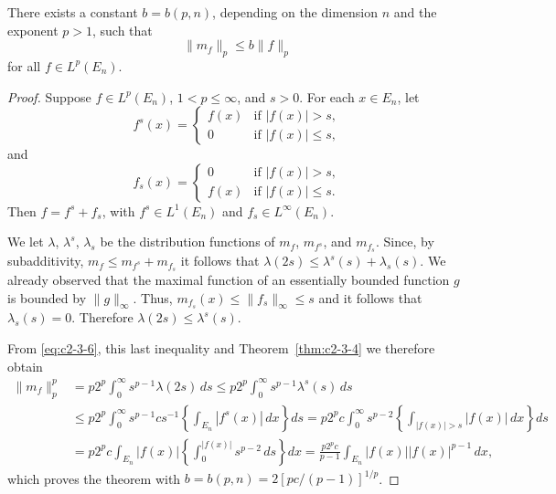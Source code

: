 \begin{theorem}\label{thm:c2-3-7}
There exists a constant $b = b(p, n)$, depending on the dimension $n$ and the exponent $p > 1$, such that
\[
\|m_f\|_p \leq b\|f\|_p
\]
for all $f \in L^p(E_n)$.
\end{theorem}

\begin{proof}
Suppose $f \in L^p(E_n)$, $1 < p \leq \infty$, and $s > 0$. For each $x \in E_n$, let
\[
f^s(x) = \begin{cases} f(x) & \text{if } |f(x)| > s, \\ 0 & \text{if } |f(x)| \leq s, \end{cases}
\]
and
\[
f_s(x) = \begin{cases} 0 & \text{if } |f(x)| > s, \\ f(x) & \text{if } |f(x)| \leq s. \end{cases}
\]
Then $f = f^s + f_s$, with $f^s \in L^1(E_n)$ and $f_s \in L^\infty(E_n)$.

We let $\lambda$, $\lambda^s$, $\lambda_s$ be the distribution functions of $m_f$, $m_{f^s}$, and $m_{f_s}$. Since, by subadditivity, $m_f \leq m_{f^s} + m_{f_s}$ it follows that $\lambda(2s) \leq \lambda^s(s) + \lambda_s(s)$. We already observed that the maximal function of an essentially bounded function $g$ is bounded by $\|g\|_\infty$. Thus, $m_{f_s}(x) \leq \|f_s\|_\infty \leq s$ and it follows that $\lambda_s(s) = 0$. Therefore $\lambda(2s) \leq \lambda^s(s)$.

From \eqref{eq:c2-3-6}, this last inequality and Theorem~\ref{thm:c2-3-4} we therefore obtain
\[
\begin{aligned}
\|m_f\|_p^p &= p2^p \int_0^\infty s^{p-1} \lambda(2s)\,ds \leq p2^p \int_0^\infty s^{p-1} \lambda^s(s)\,ds \\
&\leq p2^p \int_0^\infty s^{p-1} c s^{-1} \left\{\int_{E_n} |f^s(x)|\,dx\right\} ds
= p2^p c \int_0^\infty s^{p-2} \left\{\int_{|f(x)| > s} |f(x)|\,dx\right\} ds \\
&= p2^p c \int_{E_n} |f(x)| \left\{\int_0^{|f(x)|} s^{p-2}\,ds\right\} dx
= \frac{p2^p c}{p-1} \int_{E_n} |f(x)| |f(x)|^{p-1}\,dx,
\end{aligned}
\]
which proves the theorem with $b = b(p, n) = 2[pc/(p-1)]^{1/p}$.
\end{proof}

